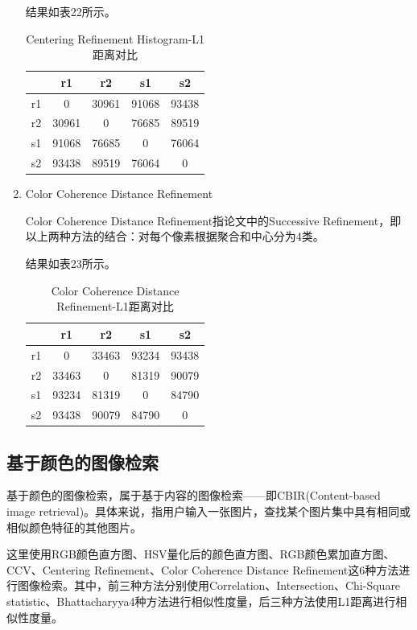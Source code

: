 \documentclass[a4paper, 12pt, UTF8]{article}
\begin{document}
\begin{enumerate}
结果如表22所示。

\begin{table}[h!]
    \centering
    \caption{Centering Refinement Histogram-L1距离对比}
    \begin{tabular}{ccccc}
         & r1 & r2 & s1 & s2 \\ \hline
        r1 & 0 & 30961 & 91068 & 93438 \\ \hline
        r2 & 30961 & 0 & 76685 & 89519 \\ \hline
        s1 & 91068 & 76685 & 0 & 76064 \\ \hline
        s2 & 93438 & 89519 & 76064 & 0 \\ \hline
    \end{tabular}
\end{table}

\item Color Coherence Distance Refinement

Color Coherence Distance Refinement指论文\cite{ref2}中的Successive Refinement，即以上两种方法的结合：对每个像素根据聚合和中心分为4类。

结果如表23所示。

\begin{table}[h!]
    \centering
    \caption{Color Coherence Distance Refinement-L1距离对比}
    \begin{tabular}{ccccc}
         & r1 & r2 & s1 & s2 \\ \hline
        r1 & 0 & 33463 & 93234 & 93438 \\ \hline
        r2 & 33463 & 0 & 81319 & 90079 \\ \hline
        s1 & 93234 & 81319 & 0 & 84790 \\ \hline
        s2 & 93438 & 90079 & 84790 & 0 \\ \hline
    \end{tabular}
\end{table}

\end{enumerate}


\subsection{基于颜色的图像检索}

基于颜色的图像检索，属于基于内容的图像检索——即CBIR(Content-based image retrieval)。具体来说，指用户输入一张图片，查找某个图片集中具有相同或相似颜色特征的其他图片。

这里使用RGB颜色直方图、HSV量化后的颜色直方图、RGB颜色累加直方图、CCV、Centering Refinement、Color Coherence Distance Refinement这6种方法进行图像检索。其中，前三种方法分别使用Correlation、Intersection、Chi-Square statistic、Bhattacharyya4种方法进行相似性度量，后三种方法使用L1距离进行相似性度量。
\end{document}
